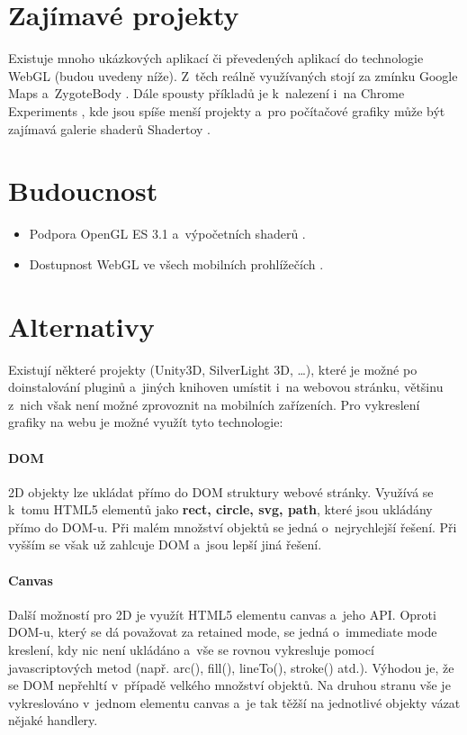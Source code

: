 \documentclass[12pt,a4paper,titlepage,final]{report}
\begin{document}
\section{Zajímavé projekty}
Existuje mnoho ukázkových aplikací či převedených aplikací do technologie WebGL (budou uvedeny níže). Z~těch reálně využívaných stojí za zmínku Google Maps \cite{maps} a~ZygoteBody \cite{zygotebody}. Dále spousty příkladů je k~nalezení i~na Chrome Experiments \cite{chromeexperiments}, kde jsou spíše menší projekty a~pro počítačové grafiky může být zajímavá galerie shaderů Shadertoy \cite{shadertoy}.

\section{Budoucnost}
\begin{itemize}
	\item Podpora OpenGL ES 3.1 a~výpočetních shaderů \cite{future}.
	\item Dostupnost WebGL ve všech mobilních prohlížečích \cite{future}.	
\end{itemize}

\section{Alternativy}
Existují některé projekty (Unity3D, SilverLight 3D, \dots), které je možné po doinstalování pluginů a~jiných knihoven umístit i~na webovou stránku, většinu z~nich však není možné zprovoznit na mobilních zařízeních. Pro vykreslení grafiky na webu je možné využít tyto technologie: 

\paragraph{DOM} 2D objekty lze ukládat přímo do DOM struktury webové stránky. Využívá se k~tomu HTML5 elementů jako \textbf{rect, circle, svg, path}, které jsou ukládány přímo do DOM-u. Při malém množství objektů se jedná o~nejrychlejší řešení. Při vyšším se však už zahlcuje DOM a~jsou lepší jiná řešení.

\paragraph{Canvas} Další možností pro 2D je využít HTML5 elementu canvas a~jeho API. Oproti DOM-u, který se dá považovat za retained mode, se jedná o~immediate mode kreslení, kdy nic není ukládáno a~vše se rovnou vykresluje pomocí javascriptových metod (např. arc(), fill(), lineTo(),  stroke() atd.). Výhodou je, že se DOM nepřehltí v~případě velkého množství objektů. Na druhou stranu vše je vykreslováno v~jednom elementu canvas a~je tak těžší na jednotlivé objekty vázat nějaké handlery.
\end{document}
